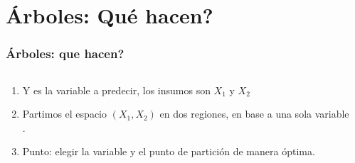 \documentclass[
  shownotes,
  xcolor={svgnames},
  hyperref={colorlinks,citecolor=DarkBlue,linkcolor=andesred,urlcolor=DarkBlue}
  , aspectratio=169]{beamer}
\begin{document}
\section{Árboles: Qué hacen?}
\begin{frame}[fragile]
\frametitle{Árboles: que hacen?}


\begin{columns}[T] %
\begin{column}{.48\textwidth}
  
\begin{enumerate}
    \footnotesize
\item Y es la variable a predecir, los insumos son $X_1$ y $X_2$
\medskip
\item  Partimos el espacio $(X_1,X_2)$ en dos regiones, en base a una sola variable .
\medskip
\item Punto: elegir la variable y el punto de partición de manera óptima.
\end{enumerate}


\end{column}  
\hfill
\begin{column}{.52\textwidth}

\end{column}
\end{columns}

\end{frame}
\end{document}
